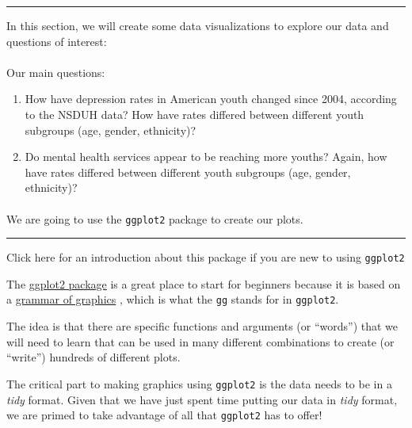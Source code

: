 \documentclass[
]{article}
\providecommand{\tightlist}{%
  \setlength{\itemsep}{0pt}\setlength{\parskip}{0pt}}
\begin{document}
\begin{center}\rule{0.5\linewidth}{0.5pt}\end{center}

In this section, we will create some data visualizations to explore our
data and questions of interest:

\hypertarget{section-18}{%
\paragraph{}\label{section-18}}

Our main questions:

\begin{enumerate}
\def\labelenumi{\arabic{enumi}.}
\tightlist
\item
  How have depression rates in American youth changed since 2004,
  according to the NSDUH data? How have rates differed between different
  youth subgroups (age, gender, ethnicity)?
\item
  Do mental health services appear to be reaching more youths? Again,
  how have rates differed between different youth subgroups (age,
  gender, ethnicity)?
\end{enumerate}

\hypertarget{section-19}{%
\paragraph{}\label{section-19}}

We are going to use the \texttt{ggplot2} package to create our plots.

\begin{center}\rule{0.5\linewidth}{0.5pt}\end{center}

Click here for an introduction about this package if you are new to
using \texttt{ggplot2}

The \href{http://ggplot2.tidyverse.org}{ggplot2 package} is a great
place to start for beginners because it is based on a
\href{http://vita.had.co.nz/papers/layered-grammar.html}{grammar of
graphics} , which is what the \texttt{gg} stands for in
\texttt{ggplot2}.

The idea is that there are specific functions and arguments (or
``words'') that we will need to learn that can be used in many different
combinations to create (or ``write'') hundreds of different plots.

The critical part to making graphics using \texttt{ggplot2} is the data
needs to be in a \emph{tidy} format. Given that we have just spent time
putting our data in \emph{tidy} format, we are primed to take advantage
of all that \texttt{ggplot2} has to offer!
\end{document}

